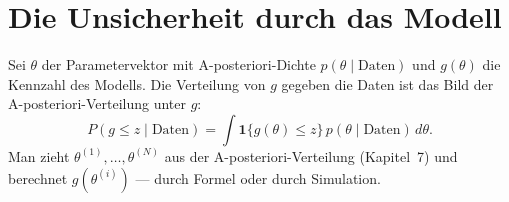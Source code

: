 \section{Die Unsicherheit durch das Modell}

\begin{definition}
Sei $\theta$ der Parametervektor mit A-posteriori-Dichte $p(\theta\mid\text{Daten})$ und $g(\theta)$ die Kennzahl des Modells. Die Verteilung von $g$ gegeben die Daten ist das Bild der A-posteriori-Verteilung unter $g$:
\[ P(g \le z\mid\text{Daten}) = \int \mathbf 1\{g(\theta)\le z\}\,p(\theta\mid\text{Daten})\,d\theta . \]
Man zieht $\theta^{(1)},\ldots,\theta^{(N)}$ aus der A-posteriori-Verteilung (Kapitel~7) und berechnet $g(\theta^{(i)})$ --- durch Formel oder durch Simulation.
\end{definition}

